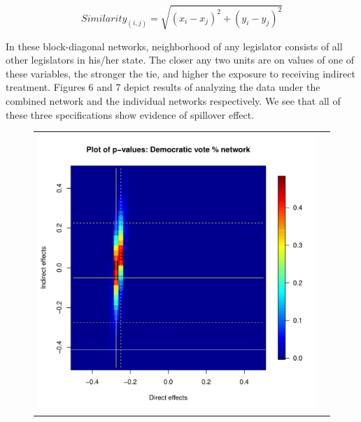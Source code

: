 \documentclass[12pt]{article}
\begin{document}
\begin{equation}
Similarity_{(i,j)} = \sqrt{{(x_i - x_j)}^2 + {(y_i - y_j)}^2}
\end{equation}

In these block-diagonal networks, neighborhood of any legislator consists of all other legislators in his/her state. The closer any two units are on values of one of these variables, the stronger the tie, and higher the exposure to receiving indirect treatment. Figures 6 and 7 depict results of analyzing the \citet{broockman2013black} data under the combined network and the individual networks respectively. We see that all of these three specifications show evidence of spillover effect.


\begin{figure}
	\centering
	\begin{tabular}{cc}
	\includegraphics[scale=0.45]{./images/pval_plot_broockman_demvotepct_raw.pdf} &

\end{tabular}
\end{figure}
\end{document}
